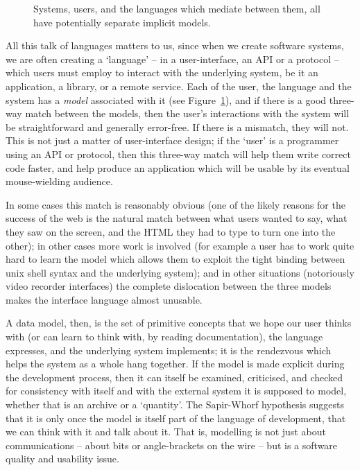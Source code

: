 \documentclass[11pt,twoside]{article}
\begin{document}
\begin{figure}
\caption{\label{f:models}Systems, users, and the languages which
mediate between them, all have potentially separate implicit models.}
\end{figure}
All this talk of languages matters to us, since when we create
software systems, we are often creating a `language' -- in a
user-interface, an API or a protocol -- which users must employ to
interact with the underlying system, be it an application, a library,
or a remote service.  Each of the user, the language and the system
has a \emph{model} associated with it (see Figure~\ref{f:models}), and
if there is a good three-way match between the models,
then the user's interactions with the
system will be straightforward and generally error-free.  If there is
a mismatch, they will not.  This is not just a matter of
user-interface design; if the `user' is a programmer using an
API or protocol, then this three-way match will help them write
correct code faster, and help produce an application which will be
usable by its eventual mouse-wielding audience.

In some cases this match is reasonably obvious (one of the likely
reasons for the success of the web is the natural match between what
users wanted to say, what they saw on the screen, and the HTML they
had to type to turn one into the other); in other cases more work is
involved (for example a user has to work quite hard to learn the model
which allows them to exploit the tight binding between unix shell
syntax and the underlying system); and in other situations
(notoriously video recorder interfaces) the complete dislocation
between the three models makes the interface language almost unusable.

A data model, then, is the set of primitive concepts that we hope our
user thinks with (or can learn to think with, by reading
documentation), the language expresses, and the underlying system
implements; it is the rendezvous which helps the system as a whole
hang together.  If the model is made explicit during the development
process, then it can itself be examined, criticised, and checked for
consistency with itself and with the external system it is supposed to
model, whether that is an archive or a `quantity'.  The Sapir-Whorf
hypothesis suggests that it is only once the model is itself part of
the language of development, that we can think with it and talk about
it.  That is, modelling is not just about communications -- about bits
or angle-brackets on the wire -- but is a software quality and
usability issue.
\end{document}
